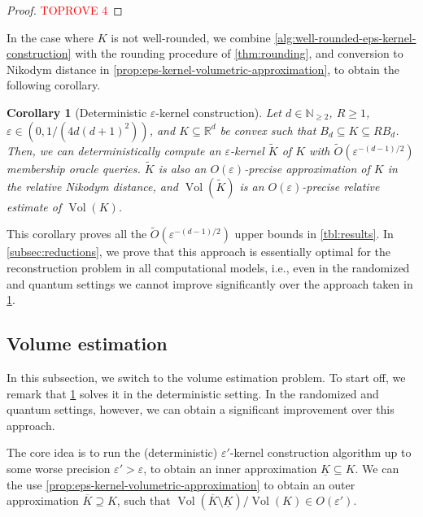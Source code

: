 \documentclass[11pt]{article}
\newtheorem{corollary}[theorem]{Corollary}
\newcommand{\N}{\ensuremath{\mathbb{N}}}
\newcommand{\R}{\ensuremath{\mathbb{R}}}
\DeclareMathOperator{\Vol}{Vol}
\begin{document}
    \begin{proof}\textcolor{red}{TOPROVE 4}\end{proof}

    In the case where $K$ is not well-rounded, we combine \cref{alg:well-rounded-eps-kernel-construction} with the rounding procedure of \cref{thm:rounding}, and conversion to Nikodym distance in \cref{prop:eps-kernel-volumetric-approximation}, to obtain the following corollary.

    \begin{corollary}[Deterministic $\varepsilon$-kernel construction]
        \label{thm:eps-kernel-construction}
        Let $d \in \N_{\geq 2}$, $R \geq 1$, $\varepsilon \in (0,1/(4d(d+1)^2))$, and $K \subseteq \R^d$ be convex such that $B_d \subseteq K \subseteq RB_d$. Then, we can deterministically compute an $\varepsilon$-kernel $\widetilde{K}$ of $K$ with $\widetilde{O}(\varepsilon^{-(d-1)/2})$ membership oracle queries. $\widetilde{K}$ is also an $O(\varepsilon)$-precise approximation of $K$ in the relative Nikodym distance, and $\Vol(\widetilde{K})$ is an $O(\varepsilon)$-precise relative estimate of $\Vol(K)$.
    \end{corollary}

    This corollary proves all the $\widetilde{O}(\varepsilon^{-(d-1)/2})$ upper bounds in \cref{tbl:results}. In \cref{subsec:reductions}, we prove that this approach is essentially optimal for the reconstruction problem in all computational models, i.e., even in the randomized and quantum settings we cannot improve significantly over the approach taken in \cref{thm:eps-kernel-construction}.

    \subsection{Volume estimation}
    \label{subsec:alg-vol-est}

    In this subsection, we switch to the volume estimation problem. To start off, we remark that \cref{thm:eps-kernel-construction} solves it in the deterministic setting. In the randomized and quantum settings, however, we can obtain a significant improvement over this approach.

    The core idea is to run the (deterministic) $\varepsilon'$-kernel construction algorithm up to some worse precision $\varepsilon' > \varepsilon$, to obtain an inner approximation $\underline{K} \subseteq K$. We can the use \cref{prop:eps-kernel-volumetric-approximation} to obtain an outer approximation $\overline{K} \supseteq K$, such that $\Vol(\overline{K} \setminus \underline{K})/\Vol(K) \in O(\varepsilon')$.
\end{document}
